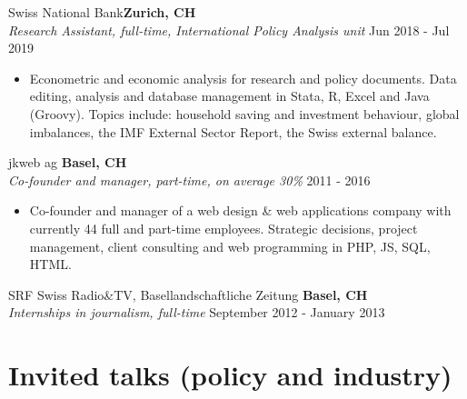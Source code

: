 \documentclass[letter, 11pt]{res}
\begin{document}
\begin{resume}
Swiss National Bank\hfill \textbf{Zurich, CH} \\
{\sl Research Assistant, full-time, International Policy Analysis unit} \hfill Jun 2018 - Jul 2019
\begin{itemize}[topsep=0pt]
	\item[--]Econometric and economic analysis for research and policy documents. Data editing, analysis and database management in Stata, R, Excel and Java (Groovy). Topics include: household saving and investment behaviour, global imbalances, the IMF External Sector Report, the Swiss external balance.
\end{itemize}

jkweb ag \hfill \textbf{Basel, CH} \\
{\sl Co-founder and manager, part-time, on average 30\%} \hfill 2011 - 2016
\begin{itemize}[topsep=0pt]
\item[--] Co-founder and manager of a web design \& web applications company with currently 44 full and part-time employees.  Strategic decisions, project management, client consulting and web programming in PHP, JS, SQL, HTML.
\end{itemize}

SRF Swiss Radio\&TV, Basellandschaftliche Zeitung \hfill \textbf{Basel, CH} \\
{\sl Internships in journalism, full-time} \hfill September 2012 - January 2013







\vspace{0.5cm}
\section{Invited talks (policy and industry)}
\vspace{1mm}


\end{resume}
\end{document}
